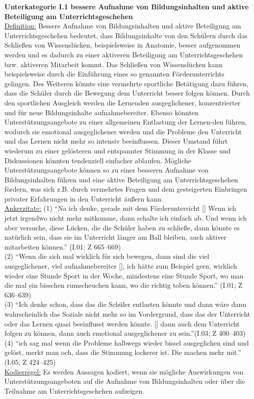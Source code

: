 \textbf{Unterkategorie I.1 bessere Aufnahme von Bildungsinhalten und aktive Beteiligung am Unterrichtsgeschehen}\\
\underline{Definition:} Bessere Aufnahme von Bildungsinhalten und aktive Beteiligung am Unterrichtsgeschehen bedeutet, dass Bildungsinhalte von den Schülern durch das Schließen von Wissenslücken, beispielsweise in Anatomie, besser aufgenommen werden und es dadurch zu einer aktiveren Beteiligung am Unterrichtsgeschehen bzw. aktiveren Mitarbeit kommt. Das Schließen von Wissenslücken kann beispielsweise durch die Einführung eines so genannten Förderunterrichts gelingen. Des Weiteren könnte eine vermehrte sportliche Betätigung dazu führen, dass die Schüler durch die Bewegung dem Unterricht besser folgen können. Durch den sportlichen Ausgleich werden die Lernenden ausgeglichener, konzentrierter und für neue Bildungsinhalte aufnahmebereiter. Ebenso könnten Unterstützungsangebote zu einer allgemeinen Entlastung der Lernen-den führen, wodurch sie emotional ausgeglichener werden und die Probleme den Unterricht und das Lernen nicht mehr so intensiv beeinflussen. Dieser Umstand führt wiederum zu einer gelösteren und entspannter Stimmung in der Klasse und Diskussionen könnten tendenziell einfacher ablaufen. Mögliche Unterstützungsangebote können so zu einer besseren Aufnahme von Bildungsinhalten führen und eine aktive Beteiligung am Unterrichtsgeschehen fördern, was sich z.B. durch vermehrtes Fragen und dem gesteigerten Einbringen privater Erfahrungen in den Unterricht äußern kann.\\
\underline{Ankerzitate:} (1) "`Na ich denke, gerade mit dem Förderunterricht [\punkte] Wenn ich jetzt irgendwo nicht mehr mitkomme, dann schalte ich einfach ab. Und wenn ich aber versuche, diese Lücken, die die Schüler haben zu schließe, dann könnte es natürlich sein, dass sie im Unterricht länger am Ball bleiben, auch aktiver mitarbeiten können."' (I.01; Z 665--669)\\ (2) "`Wenn die sich mal wirklich für sich bewegen, dann sind die viel ausgeglichener, viel aufnahmebereiter [\punkte], ich hätte zum Beispiel gern, wirklich wieder eine Stunde Sport in der Woche, mindestens eine Stunde Sport, wo man die mal ein bisschen rumscheuchen kann, wo die richtig toben können."' (I.01; Z 636--639)\\ (3) "`Ich denke schon, dass das die Schüler entlasten könnte und dann wäre dann wahrscheinlich das Soziale nicht mehr so im Vordergrund, dass das der Unterricht oder das Lernen quasi beeinflusst werden könnte. [\punkte] dann auch dem Unterricht folgen zu können, dann auch emotional ausgeglichener zu sein."'(I.03; Z 400--403)\\ (4) "`ich sag mal wenn die Probleme halbwegs wieder bissel ausgeglichen sind und gelöst, merkt man och, dass die Stimmung lockerer ist. Die machen mehr mit."' (I.05; Z 424--425)\\
\underline{Kodierregel:} Es werden Aussagen kodiert, wenn sie mögliche Auswirkungen von Unterstützungsangeboten auf die Aufnahme von Bildungsinhalten oder über die Teilnahme am Unterrichtsgeschehen aufzeigen.\\

